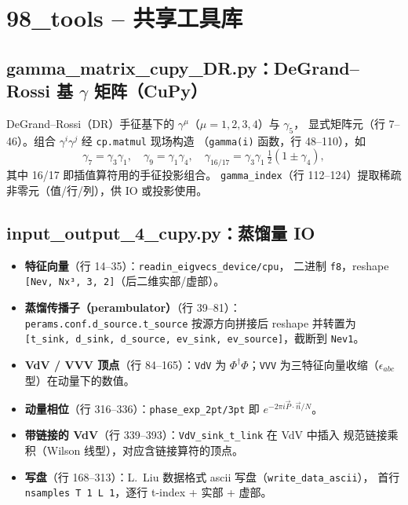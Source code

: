 \documentclass[UTF8,11pt]{ctexart}
\begin{document}
\section{98\_tools -- 共享工具库}
\label{sec:tools}

\subsection{gamma\_matrix\_cupy\_DR.py：DeGrand--Rossi 基 $\gamma$ 矩阵（CuPy）}
\label{sec:gamma}

DeGrand--Rossi（DR）手征基下的 $\gamma^\mu$（$\mu=1,2,3,4$）与 $\gamma_5$，
显式矩阵元（行 7--46）。组合 $\gamma^i\gamma^j$ 经 \texttt{cp.matmul} 现场构造
（\texttt{gamma(i)} 函数，行 48--110），如
\begin{equation}
  \gamma_7 = \gamma_3\gamma_1,\quad
  \gamma_9=\gamma_1\gamma_4,\quad
  \gamma_{16/17}=\gamma_3\gamma_1\,\tfrac12(1\pm\gamma_4),
\end{equation}
其中 16/17 即插值算符用的手征投影组合。
\texttt{gamma\_index}（行 112--124）提取稀疏非零元（值/行/列），供 IO 或投影使用。

\subsection{input\_output\_4\_cupy.py：蒸馏量 IO}
\label{sec:io}

\begin{itemize}
  \item \textbf{特征向量}（行 14--35）：\texttt{readin\_eigvecs\_device/cpu}，
  二进制 \texttt{f8}，reshape \texttt{[Nev, Nx³, 3, 2]}（后二维实部/虚部）。
  \item \textbf{蒸馏传播子（perambulator）}（行 39--81）：
  \texttt{perams.conf.d\_source.t\_source} 按源方向拼接后 reshape 并转置为
  \texttt{[t\_sink, d\_sink, d\_source, ev\_sink, ev\_source]}，截断到 \texttt{Nev1}。
  \item \textbf{VdV / VVV 顶点}（行 84--165）：\texttt{VdV} 为
  $\Phi^\dagger\Phi$；\texttt{VVV} 为三特征向量收缩（$\epsilon_{abc}$ 型）在动量下的数值。
  \item \textbf{动量相位}（行 316--336）：\texttt{phase\_exp\_2pt/3pt} 即 $e^{-2\pi i\vec P\cdot\vec n/N}$。
  \item \textbf{带链接的 VdV}（行 339--393）：\texttt{VdV\_sink\_t\_link} 在 VdV 中插入
  规范链接乘积（Wilson 线型），对应含链接算符的顶点。
  \item \textbf{写盘}（行 168--313）：L.~Liu 数据格式 ascii 写盘（\texttt{write\_data\_ascii}），
  首行 \texttt{nsamples T 1 L 1}，逐行 t-index + 实部 + 虚部。
\end{itemize}
\end{document}
